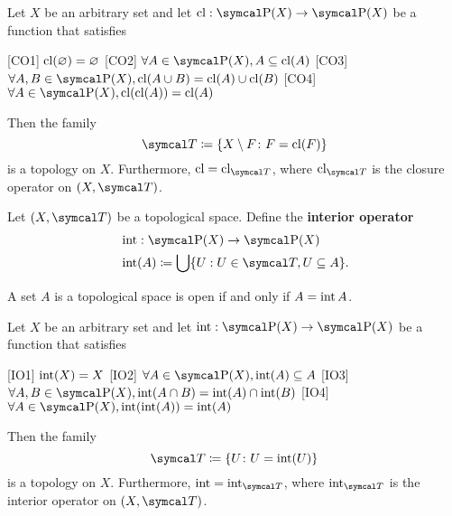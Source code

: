 \begin{proposition}\label{thm:closure_operator_axioms}\cite[14]{Engelking1989}
  Let \( X \) be an arbitrary set and let \( \Cl: \Power(X) \to \Power(X) \) be a function that satisfies
  \begin{description}
    [CO1] \( \operatorname{cl}(\varnothing) = \varnothing \)
    [CO2] \( \forall A \in \Power(X), A \subseteq \Cl(A) \)
    [CO3] \( \forall A, B \in \Power(X), \Cl(A \cup B) = \Cl(A) \cup \Cl(B) \)
    [CO4] \( \forall A \in \Power(X), \Cl(\Cl(A)) = \Cl(A) \)
  \end{description}

  Then the family
  \begin{equation*}
    \Cal{T} \coloneqq \{ X \setminus F \colon F = \Cl(F) \}
  \end{equation*}
  is a topology on \( X \). Furthermore, \( \Cl = \Cl_{\Cal{T}} \), where \( \Cl_{\Cal{T}} \) is the closure operator on \( (X, \Cal{T}) \).
\end{proposition}

\begin{definition}\label{def:interior_operator}\cite[15]{Engelking1989}
  Let \( (X, \Cal{T}) \) be a topological space. Define the \textbf{interior operator}
  \begin{align*}
    &\Int: \Power(X) \to \Power(X) \\
    &\Int(A) \coloneqq \bigcup \{ U : U \in \Cal{T}, U \subseteq A \}.
  \end{align*}
\end{definition}

\begin{proposition}\label{thm:set_open_iff_matches_interior}
  A set \( A \) is a topological space is open if and only if \( A = \operatorname{int} A \).
\end{proposition}

\begin{proposition}\label{thm:interior_operator_axioms}
  Let \( X \) be an arbitrary set and let \( \Int: \Power(X) \to \Power(X) \) be a function that satisfies
  \begin{description}
    [IO1] \( \operatorname{int}(X) = X \)
    [IO2] \( \forall A \in \Power(X), \Int(A) \subseteq A \)
    [IO3] \( \forall A, B \in \Power(X), \Int(A \cap B) = \Int(A) \cap \Int(B) \)
    [IO4] \( \forall A \in \Power(X), \Int(\Int(A)) = \Int(A) \)
  \end{description}

  Then the family
  \begin{equation*}
    \Cal{T} \coloneqq \{ U \colon U = \Int(U) \}
  \end{equation*}
  is a topology on \( X \). Furthermore, \( \Int = \Int_{\Cal{T}} \), where \( \Int_{\Cal{T}} \) is the interior operator on \( (X, \Cal{T}) \).
\end{proposition}

